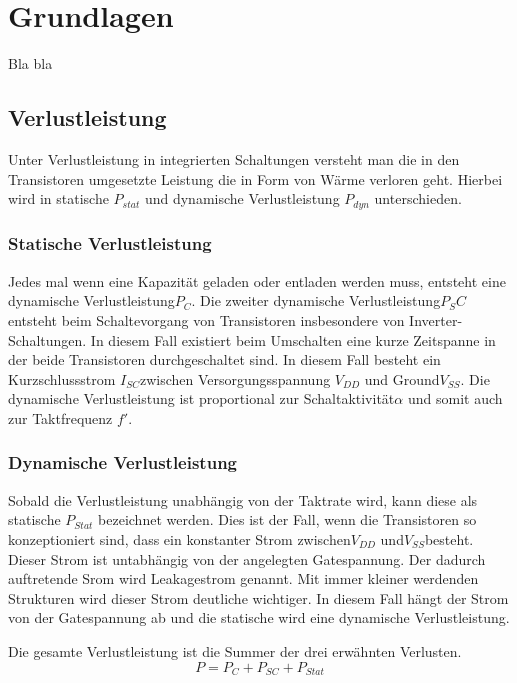 \chapter{Grundlagen}
\label{chap:grundlagen}

Bla bla

\section{Verlustleistung}
\label{sec:verlustleistung}
Unter Verlustleistung in integrierten Schaltungen versteht man die in den Transistoren umgesetzte Leistung die in Form von Wärme verloren geht.
Hierbei wird in statische \(P_{stat}\) und dynamische Verlustleistung \(P_{dyn}\) unterschieden. 
\subsection{Statische Verlustleistung}
Jedes mal wenn eine Kapazität geladen oder entladen werden muss, entsteht eine dynamische Verlustleistung\(P_C\). Die zweiter dynamische Verlustleistung\(P_SC\) entsteht beim Schaltevorgang von Transistoren insbesondere von Inverter-Schaltungen. In diesem Fall existiert beim Umschalten eine kurze Zeitspanne in der beide Transistoren durchgeschaltet sind. In diesem Fall besteht ein Kurzschlussstrom \(I_{SC}\)zwischen Versorgungsspannung \(V_{DD}\) und Ground\(V_{SS}\). Die dynamische Verlustleistung ist proportional zur Schaltaktivität\(\alpha\) und somit auch zur Taktfrequenz $f'$.
\subsection{Dynamische Verlustleistung}
Sobald die Verlustleistung unabhängig von der Taktrate wird, kann diese als statische \(P_{Stat}\) bezeichnet werden. Dies ist der Fall, wenn die Transistoren so konzeptioniert sind, dass ein konstanter Strom zwischen\(V_{DD}\) und\(V_{SS}\)besteht. Dieser Strom ist untabhängig von der angelegten Gatespannung. Der dadurch auftretende Srom wird Leakagestrom genannt. Mit immer kleiner werdenden Strukturen wird dieser Strom deutliche wichtiger. In diesem Fall hängt der Strom von der Gatespannung ab und die statische wird eine dynamische Verlustleistung.

Die gesamte Verlustleistung ist die Summer der drei erwähnten Verlusten.
\[P = P_{ C }+P_{ SC }+P_{ Stat}\]
